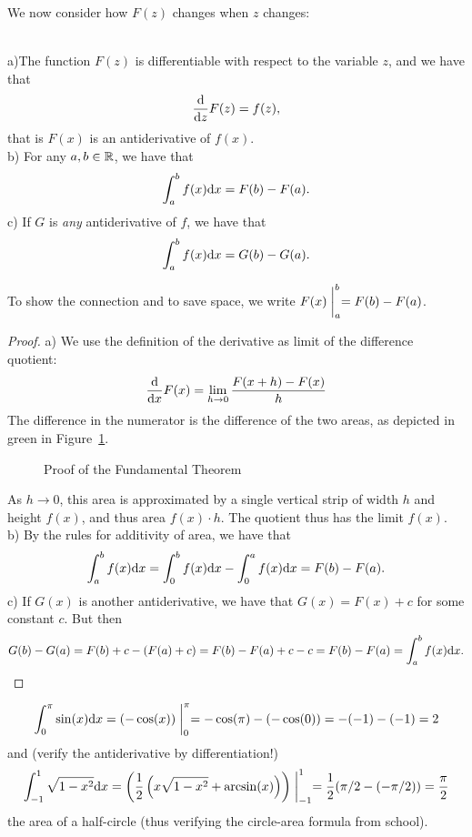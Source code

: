 We now consider how $F(z)$ changes when $z$ changes:
\begin{thm}\ \\
a)The function $F(z)$ is differentiable with respect to the variable $z$, and we
have that
\[
\frac{{\mbox{d}}}{{\mbox{d}}z} F(z)=f(z),
\]
that is $F(x)$ is an antiderivative of $f(x)$.\\
b) For any $a,b\in{\mathbb R}$, we have that 
\[
\int_a^b f(x){\mbox{d}}x=F(b)-F(a).
\]
c) If $G$ is {\em any} antiderivative of $f$, we have that
\[
\int_a^b f(x){\mbox{d}}x=G(b)-G(a).
\]
\end{thm}
To show the connection and to save space, we write $\displaystyle
F(x)\biggm|_a^b=F(b)-F(a)$.
\begin{proof}
a) We use the definition of the derivative as limit of the difference quotient:
\[
\frac{{\mbox{d}}}{{\mbox{d}}x} F(x)=\lim_{h\to 0}\frac{F(x+h)-F(x)}{h}
\]
The difference in the numerator is the difference of the two areas, as depicted in
green in Figure~\ref{figfundthm}. 
\begin{figure}
\begin{center}
\end{center}
\caption{Proof of the Fundamental Theorem}
\label{figfundthm}
\end{figure}
As $h\to 0$, this area is approximated by a single vertical strip of width $h$ and
height $f(x)$, and thus area $f(x)\cdot h$. The quotient thus has the limit
$f(x)$.\\
b) By the rules for additivity of area, we have that
\[
\int_a^b f(x){\mbox{d}}x=\int_0^b f(x){\mbox{d}}x-\int_0^a f(x){\mbox{d}}x=F(b)-F(a).
\]
c) If $G(x)$ is another antiderivative, we have that $G(x)=F(x)+c$ for some
constant $c$. But then
\[
G(b)-G(a)=F(b)+c-(F(a)+c)=F(b)-F(a)+c-c=F(b)-F(a)=\int_a^b f(x){\mbox{d}}x.
\]
\end{proof}
\begin{bsp}
\[
\int_0^\pi
\sin(x){\mbox{d}}x=(-\cos(x))\biggm|_0^\pi=-\cos(\pi)-(-\cos(0))=-(-1)-(-1)=2
\]
and (verify the antiderivative by differentiation!)
\[
\int_{-1}^1\sqrt{1-x^2}{\mbox{d}}x=\left(\frac12\left(x\sqrt{1-x^2}+\arcsin(x)\right)\right)
\biggm|_{-1}^1=\frac12(\pi/2-(-\pi/2))=\frac{\pi}{2}
\]
the area of a half-circle (thus verifying the circle-area formula from school).
\end{bsp}


